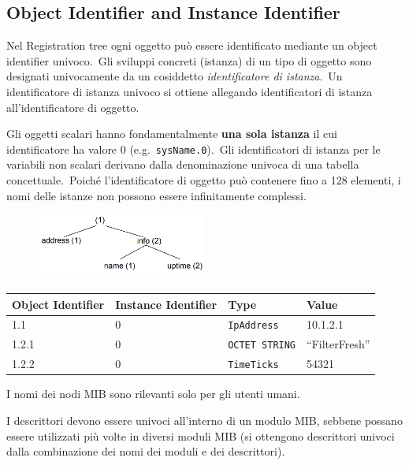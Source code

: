 \subsection{Object Identifier and Instance Identifier}

Nel Registration tree ogni oggetto può essere identificato mediante un object identifier univoco.\
Gli sviluppi concreti (istanza) di un tipo di oggetto sono designati univocamente da un cosiddetto \textit{identificatore di istanza}.\
Un identificatore di istanza univoco si ottiene allegando identificatori di istanza all'identificatore di oggetto.

Gli oggetti scalari hanno fondamentalmente \textbf{una sola istanza} il cui identificatore ha valore 0 (e.g.\ \texttt{sysName.0}).\
Gli identificatori di istanza per le variabili non scalari derivano dalla denominazione univoca di una tabella concettuale.\
Poiché l'identificatore di oggetto può contenere fino a 128 elementi, i nomi delle istanze non possono essere infinitamente complessi.
\begin{figure}[H]
    \centering
    \includegraphics[width=0.5\textwidth]{immagini/ISO_registration_tree.png}
\end{figure}
\begin{table}[H]
    \centering
    \begin{tabular}{|l l l l|}
        \hline
        Object Identifier & Instance Identifier & Type                  & Value           \\\hline
        1.1               & 0                   & \texttt{IpAddress}    & 10.1.2.1        \\
        1.2.1             & 0                   & \texttt{OCTET STRING} & ``FilterFresh'' \\
        1.2.2             & 0                   & \texttt{TimeTicks}    & 54321           \\\hline
    \end{tabular}
\end{table}

\noindent I nomi dei nodi MIB sono rilevanti solo per gli utenti umani.

I descrittori devono essere univoci all'interno di un modulo MIB, sebbene possano essere utilizzati più volte in diversi moduli MIB (si ottengono descrittori univoci dalla combinazione dei nomi dei moduli e dei descrittori).

